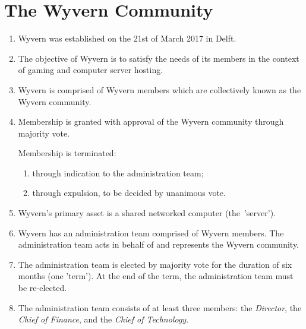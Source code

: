 \section{The Wyvern Community}
\label{sec:wyvern-community}
\begin{enumerate}
    \item Wyvern was established on the 21st of March 2017 in Delft.

    \item The objective of Wyvern is to satisfy the needs of its members in the context of gaming and computer server hosting.

    \item Wyvern is comprised of Wyvern members which are collectively known as the Wyvern community.

    \item Membership is granted with approval of the Wyvern community through majority vote.
    
    \begin{item}
        Membership is terminated:
        \begin{enumerate}
            \item through indication to the administration team;
            \item through expulsion, to be decided by unanimous vote.
        \end{enumerate}
    \end{item}

    \item Wyvern's primary asset is a shared networked computer (the~'server').

    \item Wyvern has an administration team comprised of Wyvern members. The administration team acts in behalf of and represents the Wyvern community.

    \item The administration team is elected by majority vote for the duration of six months (one 'term'). At the end of the term, the administration team must be re-elected.

    \item The administration team consists of at least three members: the \emph{Director}, the \emph{Chief of Finance}, and the \emph{Chief of Technology}.


\end{enumerate}
